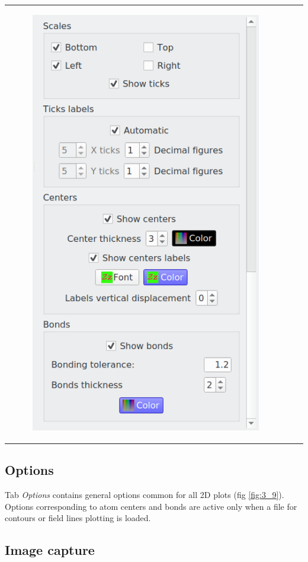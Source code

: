 \documentclass[10pt]{article}
\begin{document}
\begin{tabular}{lcr}
\begin{minipage}{.3\linewidth}
\begin{figure}[H]
\begin{center}
\includegraphics[width=.73\linewidth]{damqt320_2D_options_3.png}
\end{center}
\vspace*{-2mm}
\end{figure}
\end{minipage}
\end{tabular}

\subsection{Options \label{sec:3.7}}

Tab {\it Options} contains general options common for all 2D
plots (fig \ref{fig:3_9}). Options corresponding to atom centers and bonds are active only when 
a file for contours or field lines plotting is loaded.


\subsection{Image capture\label{sec:3.8}}
\end{document}
